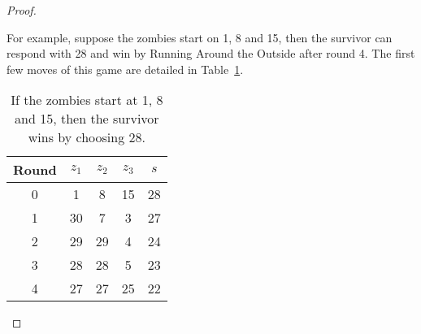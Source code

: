 \begin{proof}
\begin{enumerate}[I.]
For example, suppose the zombies start on 1, 8 and 15, then the survivor can respond with 28 and win by Running Around the Outside after round 4. The first few moves of this game are detailed in Table~\ref{table start 1 8 15}.
\begin{table}
\begin{tabular}{c | c | c | c | c }
Round & $z_1$ & $z_2$ & $z_3$ & $s$ \\
\hline
0 & 1 & 8 & 15 & 28 \\
1 & 30 & 7 & 3 & 27 \\
2 & 29 & 29 & 4 & 24 \\
3 & 28 & 28 & 5 & 23 \\
4 & 27 & 27 & 25 & 22 \\
\end{tabular}
\caption{If the zombies start at 1, 8 and 15, then the survivor wins by choosing 28. \label{table start 1 8 15}}
\end{table}

\end{enumerate}
\end{proof}
